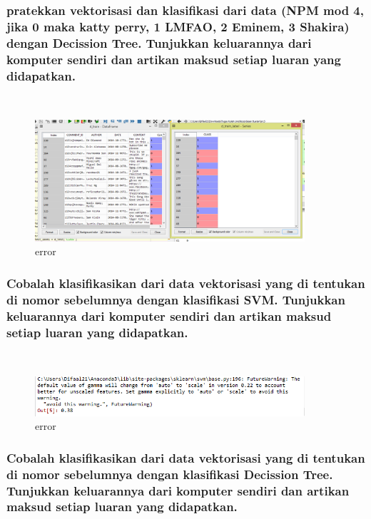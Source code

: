	\subsubsection{pratekkan vektorisasi dan klasiﬁkasi dari data (NPM mod 4, jika 0 maka katty perry, 1 LMFAO, 2 Eminem, 3 Shakira) dengan Decission Tree. Tunjukkan keluarannya dari komputer sendiri dan artikan maksud setiap luaran yang didapatkan.}\hfill\\
	
	
	
	\begin{figure}[H]
		\begin{center}
		 \includegraphics[width=10cm]{figures/1174076/figures4/8.png}
		 \caption{error}	
		\end{center}
	\end{figure}
	
	\subsubsection{Cobalah klasiﬁkasikan dari data vektorisasi yang di tentukan di nomor sebelumnya dengan klasiﬁkasi SVM. Tunjukkan keluarannya dari komputer sendiri dan artikan maksud setiap luaran yang didapatkan.}\hfill\\
	
	
	
	\begin{figure}[H]
		\begin{center}
		 \includegraphics[width=10cm]{figures/1174076/figures4/9.png}
		 \caption{error}	
		\end{center}
	\end{figure}
		
	\subsubsection{Cobalah klasiﬁkasikan dari data vektorisasi yang di tentukan di nomor sebelumnya dengan klasiﬁkasi Decission Tree. Tunjukkan keluarannya dari komputer sendiri dan artikan maksud setiap luaran yang didapatkan.}\hfill\\
	
